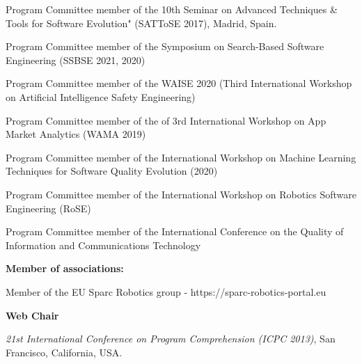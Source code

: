 \documentclass[10pt]{article}
\begin{document}
\begin{innerlist}
\item Program Committee member of the 10th Seminar on Advanced Techniques \& Tools for Software Evolution" (SATToSE 2017), Madrid, Spain.\\
\item Program Committee member of the  Symposium on Search-Based Software Engineering (SSBSE 2021, 2020) 
\item Program Committee member of the  WAISE 2020 (Third International Workshop on Artificial Intelligence Safety Engineering)
\item Program Committee member of  the  of 3rd International Workshop on App Market Analytics (WAMA 2019)  
\item Program Committee member of the  International Workshop on Machine Learning Techniques for Software Quality Evolution (2020)
\item Program Committee member of  the  International Workshop on Robotics Software Engineering (RoSE) 
\item Program Committee member of  the International Conference on the
Quality of Information and Communications Technology \\

\end{innerlist}

%
%

\textbf{Member of associations:}
\begin{innerlist}
\item Member of the EU Sparc Robotics group - https://sparc-robotics-portal.eu\\
\end{innerlist}

\textbf{Web Chair}
\begin{innerlist}
   \item \emph{21st International Conference on Program Comprehension (ICPC 2013)}, San Francisco, California, USA.\\
\end{innerlist}
\end{document}
